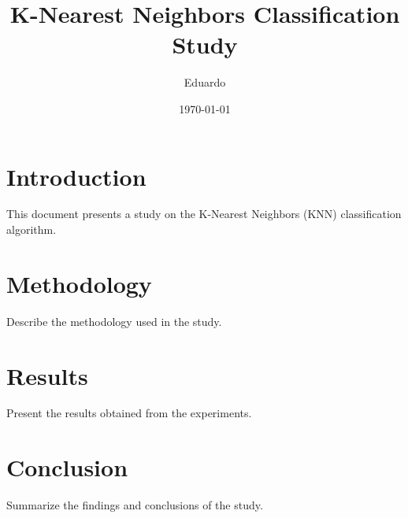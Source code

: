 \documentclass[a4paper]{article}
\title{K-Nearest Neighbors Classification Study}
\author{Eduardo}
\date{\today}
\begin{document}
\maketitle

\section{Introduction}
This document presents a study on the K-Nearest Neighbors (KNN) classification algorithm.

\section{Methodology}
Describe the methodology used in the study.

\section{Results}
Present the results obtained from the experiments.



\section{Conclusion}
Summarize the findings and conclusions of the study.
\end{document}
